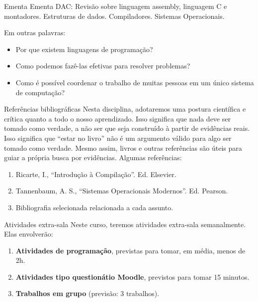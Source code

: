 \documentclass{beamer}
\begin{document}
\begin{frame}{Ementa}
Ementa DAC: Revisão sobre linguagem assembly, linguagem C e montadores. Estruturas de dados. Compiladores. Sistemas Operacionais.

\vskip 1cm

\begin{block}{Em outras palavras:}
\begin{itemize}
\item Por que existem linguagens de programação?
\item Como podemos fazê-las efetivas para resolver problemas?
\item Como é possível coordenar o trabalho de muitas pessoas em um único sistema de computação?
\end{itemize}
\end{block}
\end{frame}

\begin{frame}{Referências bibliográficas}
Nesta disciplina, adotaremos uma postura científica e crítica quanto a todo o nosso aprendizado. Isso significa que nada deve ser tomado como verdade, a não ser que seja construído à partir de evidências reais. Isso significa que ``estar no livro'' não é um argumento válido para algo ser tomado como verdade. Mesmo assim, livros e outras referências são úteis para guiar a própria busca por evidências. Algumas referências:
\begin{enumerate}
\item Ricarte, I., ``Introdução à Compilação''. Ed. Elsevier.
\item Tannenbaum, A. S., ``Sistemas Operacionais Modernos''. Ed. Pearson.
\item Bibliografia selecionada relacionada a cada assunto.
\end{enumerate}
\end{frame}


\begin{frame}{Atividades extra-sala}
\Large
Neste curso, teremos atividades extra-sala semanalmente. Elas envolverão:
\begin{enumerate}
\item \textbf{Atividades de programação}, previstas para tomar, em média, menos de 2h.
\item \textbf{Atividades tipo questionátio Moodle}, previstos para tomar 15 minutos.
\item \textbf{Trabalhos em grupo} (previsão: 3 trabalhos).
\end{enumerate}
\end{frame}
\end{document}
